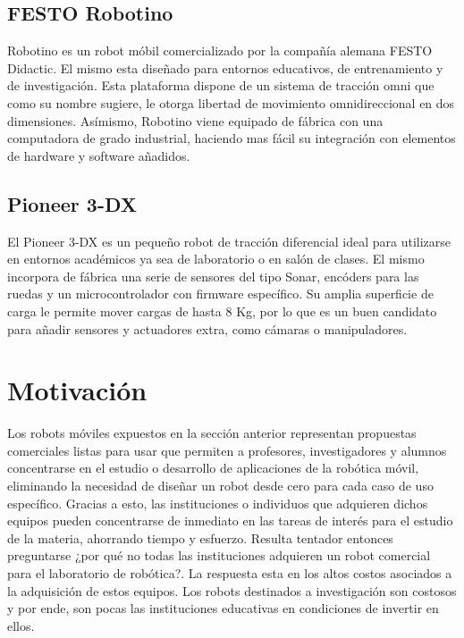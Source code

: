 \subsection{FESTO Robotino}

Robotino es un robot móbil comercializado por la compañía alemana FESTO Didactic. El mismo esta diseñado para entornos educativos, de entrenamiento y de investigación.
Esta plataforma dispone de un sistema de tracción omni que como su nombre sugiere, le otorga libertad de movimiento omnidireccional en dos dimensiones.\newline
Asímismo, Robotino viene equipado de fábrica con una computadora de grado industrial, haciendo mas fácil su integración con elementos de hardware y software añadidos.


\subsection{Pioneer 3-DX}

El Pioneer 3-DX es un pequeño robot de tracción diferencial ideal para utilizarse en entornos académicos ya sea de laboratorio o en salón de clases. El mismo incorpora de fábrica una serie de sensores del tipo Sonar, encóders para las ruedas y un microcontrolador con firmware específico.\newline
Su amplia superficie de carga le permite mover cargas de hasta 8 Kg, por lo que es un buen candidato para añadir sensores y actuadores extra, como cámaras o manipuladores.


\section{Motivación}

Los robots móviles expuestos en la sección anterior representan propuestas comerciales listas para usar que permiten a profesores, investigadores y alumnos concentrarse en el estudio o desarrollo de aplicaciones de la robótica móvil, eliminando la necesidad de diseñar un robot desde cero para cada caso de uso específico. Gracias a esto, las instituciones o individuos que adquieren dichos equipos pueden concentrarse de inmediato en las tareas de interés para el estudio de la materia, ahorrando tiempo y esfuerzo.\newline
Resulta tentador entonces preguntarse ¿por qué no todas las instituciones adquieren un robot comercial para el laboratorio de robótica?. La respuesta esta en los altos costos asociados a la adquisición de estos equipos. Los robots destinados a investigación son costosos y por ende, son pocas las instituciones educativas en condiciones de invertir en ellos.


